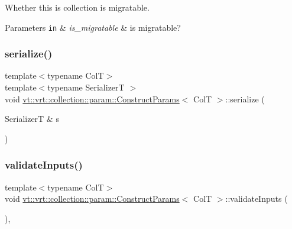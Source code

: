 Whether this is collection is migratable. 


\begin{DoxyParams}[1]{Parameters}
\mbox{\tt in}  & {\em is\+\_\+migratable} & is migratable? \\
\hline
\end{DoxyParams}
\mbox{\label{structvt_1_1vrt_1_1collection_1_1param_1_1_construct_params_a315a60ef3b90e398f68a8abf02561b05}} 
\subsubsection{\texorpdfstring{serialize()}{serialize()}}
{\footnotesize\ttfamily template$<$typename ColT$>$ \\
template$<$typename SerializerT $>$ \\
void \hyperlink{structvt_1_1vrt_1_1collection_1_1param_1_1_construct_params}{vt\+::vrt\+::collection\+::param\+::\+Construct\+Params}$<$ ColT $>$\+::serialize (\begin{DoxyParamCaption}\item[{SerializerT \&}]{s }\end{DoxyParamCaption})\hspace{0.3cm}{\ttfamily [inline]}}

\mbox{\label{structvt_1_1vrt_1_1collection_1_1param_1_1_construct_params_a6290541ab30870daf78af1984ddc164d}} 
\subsubsection{\texorpdfstring{validate\+Inputs()}{validateInputs()}}
{\footnotesize\ttfamily template$<$typename ColT$>$ \\
void \hyperlink{structvt_1_1vrt_1_1collection_1_1param_1_1_construct_params}{vt\+::vrt\+::collection\+::param\+::\+Construct\+Params}$<$ ColT $>$\+::validate\+Inputs (\begin{DoxyParamCaption}{ }\end{DoxyParamCaption})\hspace{0.3cm}{\ttfamily [inline]}, {\ttfamily [private]}}



